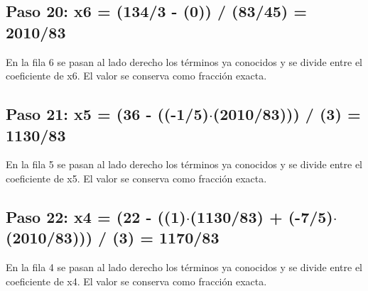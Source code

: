 \documentclass[conference]{IEEEtran}
\begin{document}
\medskip
\subsection*{Paso 20: x6 = (134/3 - (0)) / (83/45) = 2010/83}
En la fila 6 se pasan al lado derecho los términos ya conocidos y se divide entre el coeficiente de x6. El valor se conserva como fracción exacta.


\medskip
\subsection*{Paso 21: x5 = (36 - ((-1/5)\(\cdot\)(2010/83))) / (3) = 1130/83}
En la fila 5 se pasan al lado derecho los términos ya conocidos y se divide entre el coeficiente de x5. El valor se conserva como fracción exacta.


\medskip
\subsection*{Paso 22: x4 = (22 - ((1)\(\cdot\)(1130/83) + (-7/5)\(\cdot\)(2010/83))) / (3) = 1170/83}
En la fila 4 se pasan al lado derecho los términos ya conocidos y se divide entre el coeficiente de x4. El valor se conserva como fracción exacta.
\end{document}
